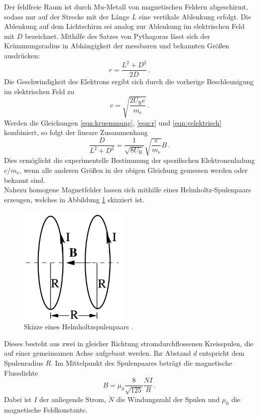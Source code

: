 Der feldfreie Raum ist durch Mu-Metall von magnetischen Feldern abgeschirmt, sodass
nur auf der Strecke mit der Länge $L$ eine vertikale Ablenkung erfolgt. Die Ablenkung
auf dem Lichtschirm sei analog zur Ablenkung im elektrischen Feld mit $D$ bezeichnet.
Mithilfe des Satzes von Pythagoras lässt sich der Krümmungsradius in Abhängigkeit
der messbaren und bekannten Größen ausdrücken:
\begin{equation}
  r = \frac{L^2 + D^2}{2 D}\,.
  \label{eqn:r}
\end{equation}
Die Geschwindigkeit des Elektrons ergibt sich durch die vorherige Beschleunigung
im elektrischen Feld zu
\begin{equation}
  v = \sqrt{\frac{2 U_\text{B} e}{m_\text{e}}}\,.
  \label{eqn:velektrisch}
\end{equation}
Werden die Gleichungen \eqref{eqn:kruemmung}, \eqref{eqn:r} und \eqref{eqn:velektrisch}
kombiniert, so folgt der lineare Zusammenhang
\begin{equation}
  \frac{D}{L^2 + D^2} = \frac{1}{\sqrt{8 U_\text{B}}} \sqrt{\frac{e}{m_\text{e}}} B\,.
\end{equation}
Dies ermöglicht die experimentelle Bestimmung der spezifischen Elektronenladung
$e/m_\text{e}$, wenn alle anderen Größen in der obigen Gleichung gemessen werden
oder bekannt sind. \\

Nahezu homogene Magnetfelder lassen sich mithilfe eines Helmholtz-Spulenpaars erzeugen, welches
in Abbildung \ref{fig:helmholtz} skizziert ist.

\begin{figure}
  \centering
  \includegraphics[width=150pt]{data/helmholtz.png}
  \caption{Skizze eines Helmholtzspulenpaars \cite{Versuchsanleitung308}.}
  \label{fig:helmholtz}
\end{figure}

Dieses besteht aus zwei in gleicher Richtung stromdurchflossenen Kreisspulen, die
auf einer gemeinsamen Achse aufgebaut werden. Ihr Abstand $d$ entspricht dem Spulenradius $R$.
Im Mittelpunkt des Spulenpaares beträgt die magnetische Flussdichte
\begin{equation}
  B = \mu_0 \frac{8}{\sqrt{125}} \frac{N I}{R}\,.
  \label{eqn:helmholtz}
\end{equation}
Dabei ist $I$ der anliegende Strom, $N$ die Windungszahl der Spulen und $\mu_0$
die magnetische Feldkonstante.
